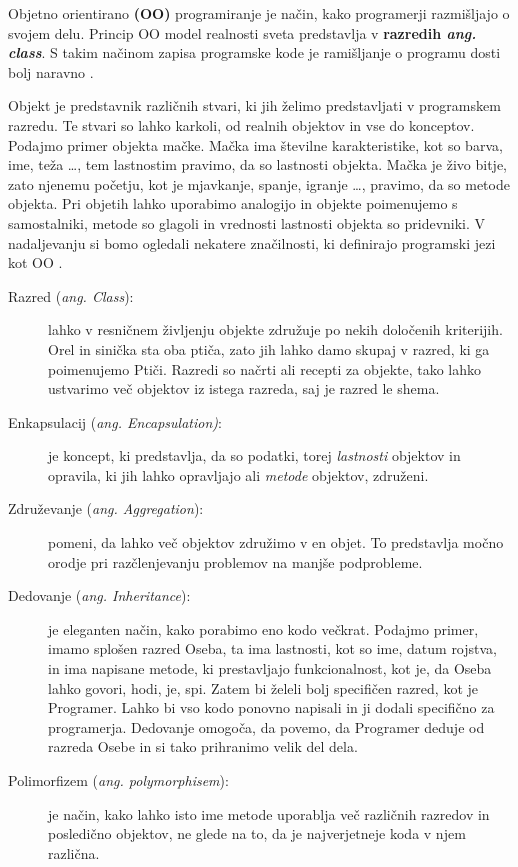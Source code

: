 
Objetno orientirano \textbf{(OO)} programiranje je način, kako
programerji razmišljajo o svojem delu. Princip OO model realnosti
sveta predstavlja v \textbf{razredih \emph{ang. class}}. S takim
načinom zapisa programske kode je ramišljanje o programu dosti bolj
naravno \cite{shaums}.

Objekt je predstavnik različnih stvari, ki jih želimo predstavljati v
programskem razredu. Te stvari so lahko karkoli, od realnih objektov
in vse do konceptov. Podajmo primer objekta mačke. Mačka ima številne
karakteristike, kot so barva, ime, teža \dots, tem lastnostim pravimo,
da so lastnosti objekta. Mačka je živo bitje, zato njenemu početju,
kot je mjavkanje, spanje, igranje \dots, pravimo, da so metode
objekta. Pri objetih lahko uporabimo analogijo in objekte poimenujemo
s samostalniki, metode so glagoli in vrednosti lastnosti objekta so
pridevniki. V nadaljevanju si bomo ogledali nekatere značilnosti, ki
definirajo programski jezi kot OO \cite{OO-JS}.

\begin{description}
\item[Razred (\emph{ang. Class}):] lahko v resničnem življenju objekte
  združuje po nekih določenih kriterijih. Orel in sinička sta oba
  ptiča, zato jih lahko damo skupaj v razred, ki ga poimenujemo
  Ptiči. Razredi so načrti ali recepti za objekte, tako lahko
  ustvarimo več objektov iz istega razreda, saj je razred le shema.
\item [Enkapsulacij (\emph{ang. Encapsulation)}:] je koncept, ki
  predstavlja, da so podatki, torej \emph{lastnosti} objektov in
  opravila, ki jih lahko opravljajo ali \emph{metode} objektov,
  združeni.
\item [Združevanje (\emph{ang. Aggregation}):] pomeni, da lahko več
  objektov združimo v en objet. To predstavlja močno orodje pri
  razčlenjevanju problemov na manjše podprobleme.
\item [Dedovanje (\emph{ang. Inheritance}):] je eleganten način, kako
  porabimo eno kodo večkrat. Podajmo primer, imamo splošen razred
  Oseba, ta ima lastnosti, kot so ime, datum rojstva, in ima napisane
  metode, ki prestavljajo funkcionalnost, kot je, da Oseba lahko
  govori, hodi, je, spi. Zatem bi želeli bolj specifičen razred, kot je
  Programer. Lahko bi vso kodo ponovno napisali in ji dodali
  specifično za programerja. Dedovanje omogoča, da povemo, da Programer
  deduje od razreda Osebe in si tako prihranimo velik del dela.
\item [Polimorfizem (\emph{ang. polymorphisem}):] je način, kako lahko
  isto ime metode uporablja več različnih razredov in posledično
  objektov, ne glede na to, da je najverjetneje koda v njem
  različna.
\end{description}

